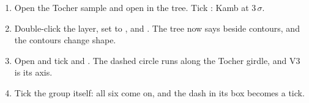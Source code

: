 \begin{tryit}
\begin{enumerate}
\item Open the Tocher sample and open  in the tree. Tick : Kamb at 3\,$\sigma$.
\item Double-click the layer, set  to , and . The tree
now says  beside contours, and the contours change shape.
\item Open  and tick  and . The dashed circle runs along the
Tocher girdle, and V3 is its axis.
\item Tick the  group itself: all six come on, and the dash in its box becomes a tick.
\end{enumerate}
\end{tryit}
